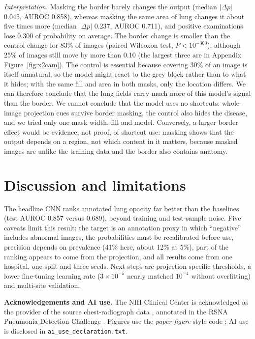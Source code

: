 \documentclass[11pt,a4paper]{article}
\begin{document}
\noindent\emph{Interpretation.} Masking the border barely changes the output (median $|\Delta p|$ 0.045, AUROC 0.858),
whereas masking the same area of lung changes it about five times more (median $|\Delta p|$ 0.237, AUROC 0.711), and
positive examinations lose 0.300 of probability on average. The border change is smaller than the control change for 83\%
of images (paired Wilcoxon test, $P < 10^{-300}$), although 25\% of images still move by more than 0.10 (the largest three are in Appendix Figure~\ref{fig:x2cam}). The control is
essential because covering 30\% of an image is itself unnatural, so the model might react to the grey block rather than to
what it hides; with the same fill and area in both masks, only the location differs. We can therefore conclude that the lung fields carry much more of this model's signal than the border. We cannot conclude that the model uses no shortcuts: whole-image projection cues survive border masking, the control also hides the disease, and we tried only one mask width, fill and model. Conversely, a larger border effect would be evidence, not proof, of shortcut use: masking shows that the output depends on a region, not which content in it matters, because masked images are unlike the training data and the border also contains anatomy.

\section{Discussion and limitations}
The headline CNN ranks annotated lung opacity far better than the baselines (test AUROC 0.857 versus 0.689), beyond
training and test-sample noise. Five caveats limit this result: the target is an annotation proxy in which ``negative'' includes abnormal images, the probabilities must be recalibrated before use, precision depends on prevalence (41\% here, about 12\% at 5\%), part of the ranking appears to come from the projection, and all results come from one hospital, one split and three seeds. Next steps are projection-specific thresholds, a lower fine-tuning learning rate ($3\times10^{-5}$ nearly matched $10^{-4}$ without overfitting) and multi-site validation.

\FloatBarrier
\medskip\noindent\textbf{Acknowledgements and AI use.} The NIH Clinical Center is acknowledged as the provider of the source chest-radiograph data \cite{wang2017}, annotated in the RSNA Pneumonia Detection Challenge \cite{rsna2018,shih2019}. Figures use the \emph{paper-figure} style code \cite{paperfigure}; AI use is disclosed in \texttt{ai\_use\_declaration.txt}.
\end{document}
